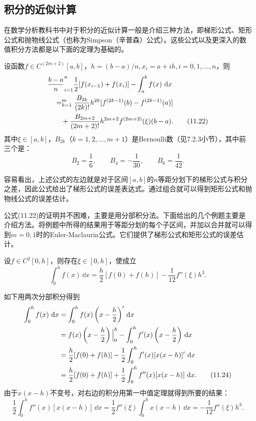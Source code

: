 \subsection{积分的近似计算}

在数学分析教科书中对于积分的近似计算一般是介绍三种方法，即梯形公式、矩形公式和抛物线公式（也称为Simpson（辛普森）公式）。这些公式以及更深入的数值积分方法都是以下面的定理为基础的。

\begin{xproposition}
设函数$f\in C^{(2m+2)}[a,b]$，$h=(b-a)/n,x_i=a+ih,i=0,1,\ldots,n$，则
\begin{align}
&\frac{b-a}{n}\relax_{i=1}^n\frac12[f(x_{i-1})+f(x_i)]-\int_a^bf(x)\,\mathop{}\!\mathrm{d} x\notag\\
&\quad=\relax_{k=1}^m\frac{B_{2k}}{(2k)!}h^{2k}[f^{(2k-1)}(b)-f^{(2k-1)}(a)]\notag\\
&\qquad+\frac{B_{2m+2}}{(2m+2)!}h^{2m+2}f^{(2m+2)}(\xi)(b-a).
\tag{11.22}
\label{eq:11.22}
\end{align}
其中$\xi\in[a,b]$，$B_{2k}$（$k=1,2,\ldots,m+1$）是Bernoulli数（见7.2.3小节），其中前三个是：
\[
  B_2=\frac16,\qquad B_4=-\frac1{30},\qquad B_6=\frac1{42}.
\]
\end{xproposition}

容易看出，上述公式的左边就是对于区间$[a,b]$的$n$等距分划下的梯形公式与积分之差，因此公式给出了梯形公式的误差表达式。通过组合就可以得到矩形公式和抛物线公式的误差估计。

公式(11.22)的证明并不困难，主要是用分部积分法。下面给出的几个例题主要是介绍方法。将例题中所得的结果用于等距分划的每个子区间，并加以合并就可以得到$m=0,1$时的Euler-Maclaurin公式。它们提供了梯形公式和矩形公式的误差估计。

\begin{xexample}[11.3.4]
设$f\in C^2[0,h]$，则存在$\xi\in[0,h]$，使成立
\begin{equation}
  \int_0^hf(x)\,\dd x=\frac h2[f(0)+f(h)]-\frac1{12}f''(\xi)h^3.
  \tag{11.23}
  \label{eq:11.23}
\end{equation}
\end{xexample}
\begin{xproof}
如下用两次分部积分得到
\begin{align}
\int_0^hf(x)\,\mathop{}\!\mathrm{d} x
&=\int_0^hf(x)\left(x-\frac h2\right)'\,\mathop{}\!\mathrm{d} x\notag\\
&=f(x)\left(x-\frac h2\right)\Big|_0^h-\int_0^hf'(x)\left(x-\frac h2\right)\,\mathop{}\!\mathrm{d} x\notag\\
&=\frac h2[f(0)+f(h)]-\frac12\int_0^hf'(x)[x(x-h)]'\,\mathop{}\!\mathrm{d} x\notag\\
&=\frac h2[f(0)+f(h)]+\frac12\int_0^hf''(x)[x(x-h)]\,\mathop{}\!\mathrm{d} x.
\tag{11.24}
\label{eq:11.24}
\end{align}
由于$x(x-h)$不变号，对右边的积分用第一中值定理就得到所要的结果：
\[
  \frac12\int_0^hf''(x)[x(x-h)]\,\dd x
  =\frac12f''(\xi)\int_0^hx(x-h)\,\dd x
  =-\frac1{12}f''(\xi)h^3.
\]
\end{xproof}

